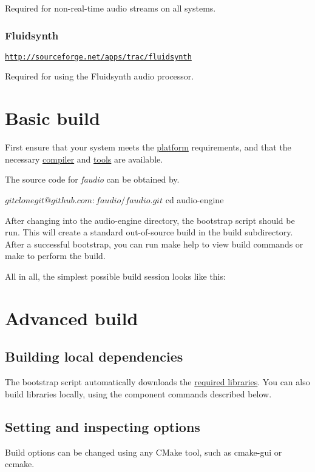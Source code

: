 Required for non-\/real-\/time audio streams on all systems.

\subsubsection*{Fluidsynth}

\href{http://sourceforge.net/apps/trac/fluidsynth}{\tt http\-://sourceforge.\-net/apps/trac/fluidsynth}

Required for using the Fluidsynth audio processor.\hypertarget{md__build_and_install_BasicBuild}{}\section{Basic build}\label{md__build_and_install_BasicBuild}
First ensure that your system meets the \hyperlink{md__build_and_install_Platform}{platform} requirements, and that the necessary \hyperlink{md__build_and_install_Compiler}{compiler} and \hyperlink{md__build_and_install_Tools}{tools} are available.

The source code for {\itshape faudio} can be obtained by. \begin{DoxyVerb}$ git clone git@github.com:faudio/faudio.git
$ cd audio-engine
\end{DoxyVerb}


After changing into the {\ttfamily audio-\/engine} directory, the {\ttfamily bootstrap} script should be run. This will create a standard out-\/of-\/source build in the {\ttfamily build} subdirectory. After a successful bootstrap, you can run {\ttfamily make help} to view build commands or {\ttfamily make} to perform the build.

All in all, the simplest possible build session looks like this\-: 
\hypertarget{md__build_and_install_AdvancedBuild}{}\section{Advanced build}\label{md__build_and_install_AdvancedBuild}
\hypertarget{md__build_and_install_Dependencies}{}\subsection{Building local dependencies}\label{md__build_and_install_Dependencies}
The bootstrap script automatically downloads the \hyperlink{md__build_and_install_Libraries}{required libraries}. You can also build libraries locally, using the component commands described below.\hypertarget{md__build_and_install_SettingOptions}{}\subsection{Setting and inspecting options}\label{md__build_and_install_SettingOptions}
Build options can be changed using any C\-Make tool, such as {\ttfamily cmake-\/gui} or {\ttfamily ccmake}.

